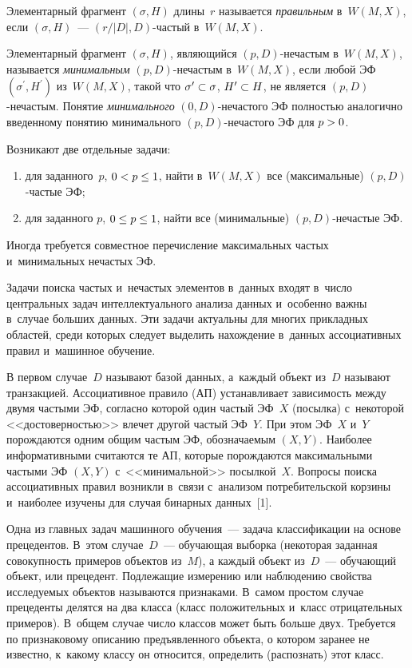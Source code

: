 \begin{multicols}{2}
  Элементарный фрагмент $(\sigma, H)$ длины~$r$ называется 
\textit{правильным} в~$W(M,X)$, если $(\sigma, H)$~---   
$(r/\vert D\vert, D)$-час\-тый в~$W(M,X)$.
  
  Элементарный фрагмент  $(\sigma, H)$, являющийся $(p,D)$-не\-час\-тым 
в~$W(M,X)$, называется \textit{минимальным} $(p,D)$-не\-час\-тым 
в~$W(M,X)$, если любой ЭФ $(\sigma^\prime, H^\prime)$ из~$W(M,X)$, такой 
что $\sigma^\prime \hm\subset \sigma$, $H^\prime\hm\subset H$, не является 
$(p,D)$-не\-час\-тым. Понятие \textit{минимального} $(0,D)$-не\-час\-то\-го ЭФ 
полностью аналогично введенному понятию минимального  
$(p,D)$-не\-час\-то\-го ЭФ для $p\hm>0$.
  
  Возникают две отдельные задачи: 
  \begin{enumerate}[(1)]
  \item для заданного~$p$, $0\hm< p\hm\leq 1$, 
найти в~$W(M,X)$ все (максимальные) $(p,D)$-час\-тые ЭФ; 
\item для заданного 
$p$, $0\hm\leq p\leq 1$, найти все (минимальные) $(p,D)$-не\-час\-тые ЭФ. 
\end{enumerate}
Иногда требуется совместное перечисление максимальных частых 
и~минимальных не\-час\-тых ЭФ.

  
  Задачи поиска частых и~нечастых элементов в~данных входят в~число 
центральных задач интеллектуального анализа данных и~особенно важны 
в~случае больших данных. Эти задачи актуальны для многих прикладных 
областей, среди которых следует выделить нахождение в~данных 
ассоциативных правил и~машинное обучение.
  
  В первом случае~$D$ называют базой данных, а~каж\-дый объект из~$D$ 
называют транзакцией. Ассоциативное правило (АП) устанавливает 
зависимость между двумя частыми ЭФ, согласно которой один частый ЭФ~$X$ 
(посылка) с~некоторой <<до\-сто\-вер\-ностью>> влечет другой частый 
ЭФ~$Y$. При этом ЭФ~$X$ и~$Y$ порождаются одним общим частым ЭФ, 
обозначаемым $(X,Y)$. Наиболее информативными считаются те АП, которые 
порождаются максимальными частыми ЭФ $(X,Y)$ с~<<минимальной>> 
посылкой~$X$. Вопросы поиска ассоциативных правил возникли в~связи 
с~анализом потребительской корзины и~наиболее изучены для случая 
бинарных данных~[1].
  
  Одна из главных задач машинного обучения~--- задача классификации на 
основе прецедентов. В~этом случае~$D$~--- обучающая выборка (некоторая 
заданная совокупность примеров объектов из~$M$), а каждый объект  
из~$D$~--- обуча\-ющий объект, или прецедент. Подлежащие измерению или 
наблюдению свойства исследуемых объектов называются признаками. 
В~самом простом случае прецеденты делятся на два класса (класс 
положительных и~класс отрицательных примеров). В~общем случае число 
классов может быть больше двух. Требуется по признаковому описанию 
предъявленного объекта, о котором заранее не известно, к~какому классу он 
относится, определить (распознать) этот класс.
  

\end{multicols}
